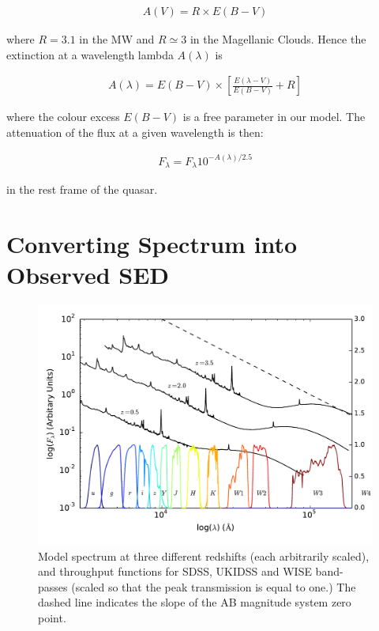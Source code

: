 \begin{eqnarray}
  A(V) = R \times E(B -V )
\end{eqnarray}

where $R = 3.1$ in the MW and $R \simeq 3$ in the Magellanic Clouds. Hence the extinction at a wavelength lambda $A(\lambda)$ is 

\begin{eqnarray}
  A(\lambda) = E(B-V) \times \left[ \frac{E(\lambda-V)}{E(B-V)} + R \right] 
\end{eqnarray}

where the colour excess $E(B-V)$ is a free parameter in our model. The attenuation of the flux at a given wavelength is then:

\begin{eqnarray}
  F_\lambda = F_\lambda10^{-A(\lambda)/2.5}
\end{eqnarray}

in the rest frame of the quasar. 

\section{Converting Spectrum into Observed SED}
\label{sec:sedconversion}

\begin{figure}
  \centering
  \includegraphics[width=\textwidth]{figures/chapter06/throughputs}
  \caption{Model spectrum at three different redshifts (each arbitrarily scaled), and throughput functions for SDSS, UKIDSS and WISE band-passes (scaled so that the peak transmission is equal to one.) The dashed line indicates the slope of the AB magnitude system zero point.}
  \label{fig:filters}
\end{figure}

